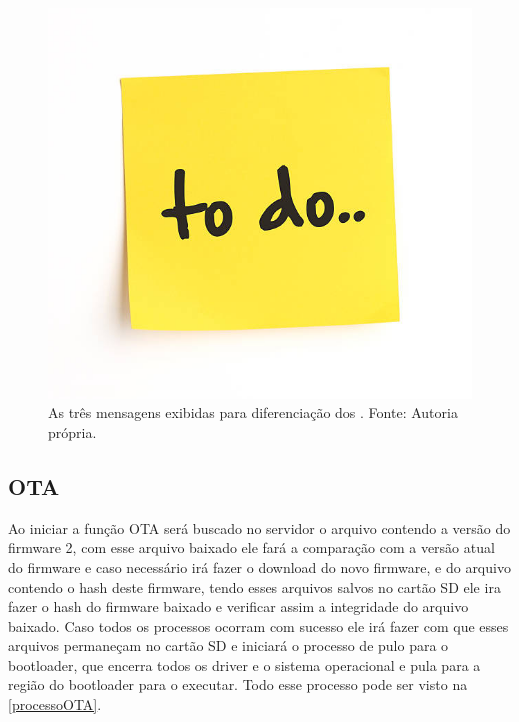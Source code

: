 \begin{figure}[H]
    \scriptsize
     \centering
     \includegraphics[scale=1.2]{dados/figuras/ToDo.jpg}
     \caption{As três mensagens exibidas para diferenciação dos \firmware. \newline Fonte: Autoria própria.}
     \label{fraseidentificacao}
\end{figure}


\subsection{OTA}
Ao iniciar a função OTA será buscado no servidor o arquivo contendo a versão do firmware 2, com esse arquivo baixado ele fará a comparação com a versão atual do firmware e caso necessário irá fazer o download do novo firmware, e do arquivo contendo o hash deste firmware, tendo esses arquivos salvos no cartão SD ele ira fazer o hash do firmware baixado e verificar assim a integridade do arquivo baixado. Caso todos os processos ocorram com sucesso ele irá fazer com que esses arquivos permaneçam no cartão SD e iniciará o processo de pulo para o bootloader, que encerra todos os driver e o sistema operacional e pula para a região do bootloader para o executar. Todo esse processo pode ser visto na \autoref{processoOTA}.


